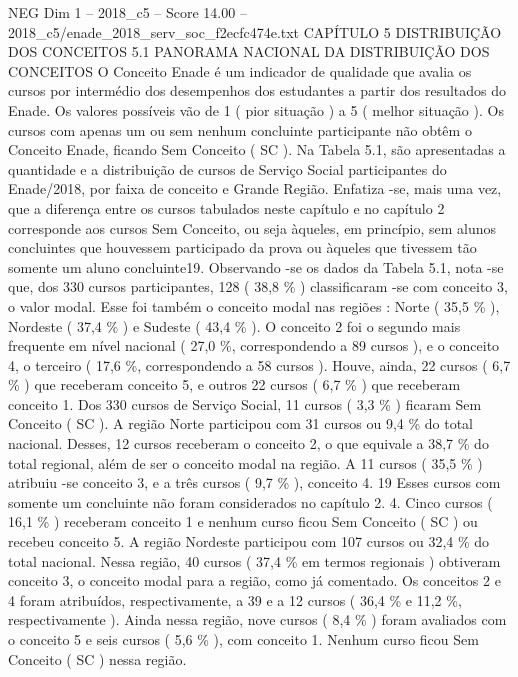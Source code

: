 \begin{textsample}{NEG Dim 1 – 2018\_c5 – Score 14.00 – 2018\_c5/enade\_2018\_serv\_soc\_f2ecfc474e.txt}  \label{ex:f1_neg_375}
CAPÍTULO 5 DISTRIBUIÇÃO DOS CONCEITOS 5.1 PANORAMA NACIONAL DA DISTRIBUIÇÃO DOS CONCEITOS O Conceito Enade é um indicador de qualidade que avalia os cursos por intermédio dos desempenhos dos estudantes a partir dos resultados do Enade.
Os valores possíveis vão de 1 ( pior situação ) a 5 ( melhor situação ).
Os cursos com apenas um ou sem nenhum concluinte participante não obtêm o Conceito Enade, ficando Sem Conceito ( SC ).
Na Tabela 5.1, são apresentadas a quantidade e a distribuição de cursos de Serviço Social participantes do Enade/2018, por faixa de conceito e Grande Região.
Enfatiza -se, mais uma vez, que a diferença entre os cursos tabulados neste capítulo e no capítulo 2 corresponde aos cursos Sem Conceito, ou seja àqueles, em princípio, sem alunos concluintes que houvessem participado da prova ou àqueles que tivessem tão somente um aluno concluinte19.
Observando -se os dados da Tabela 5.1, nota -se que, dos 330 cursos participantes, 128 ( 38,8 \% ) classificaram -se com conceito 3, o valor modal.
Esse foi também o conceito modal nas regiões : Norte ( 35,5 \% ), Nordeste ( 37,4 \% ) e Sudeste ( 43,4 \% ).
O conceito 2 foi o segundo mais frequente em nível nacional ( 27,0 \%, correspondendo a 89 cursos ), e o conceito 4, o terceiro ( 17,6 \%, correspondendo a 58 cursos ).
Houve, ainda, 22 cursos ( 6,7 \% ) que receberam conceito 5, e outros 22 cursos ( 6,7 \% ) que receberam conceito 1.
Dos 330 cursos de Serviço Social, 11 cursos ( 3,3 \% ) ficaram Sem Conceito ( SC ).
A região Norte participou com 31 cursos ou 9,4 \% do total nacional.
Desses, 12 cursos receberam o conceito 2, o que equivale a 38,7 \% do total regional, além de ser o conceito modal na região.
A 11 cursos ( 35,5 \% ) atribuiu -se conceito 3, e a três cursos ( 9,7 \% ), conceito 4. 19 Esses cursos com somente um concluinte não foram considerados no capítulo 2. 4.
Cinco cursos ( 16,1 \% ) receberam conceito 1 e nenhum curso ficou Sem Conceito ( SC ) ou recebeu conceito 5.
A região Nordeste participou com 107 cursos ou 32,4 \% do total nacional.
Nessa região, 40 cursos ( 37,4 \% em termos regionais ) obtiveram conceito 3, o conceito modal para a região, como já comentado.
Os conceitos 2 e 4 foram atribuídos, respectivamente, a 39 e a 12 cursos ( 36,4 \% e 11,2 \%, respectivamente ).
Ainda nessa região, nove cursos ( 8,4 \% ) foram avaliados com o conceito 5 e seis cursos ( 5,6 \% ), com conceito 1.
Nenhum curso ficou Sem Conceito ( SC ) nessa região.

\end{textsample}
